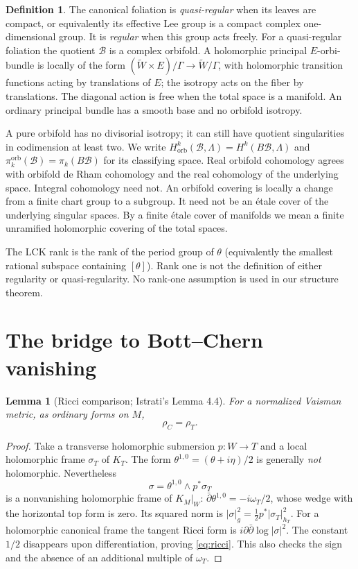 \documentclass[12pt]{amsart}
\newtheorem{lem}[thm]{Lemma}
\theoremstyle{definition}
\newtheorem{defn}[thm]{Definition}
\theoremstyle{remark}
\numberwithin{equation}{section}
\newcommand{\cB}{\mathcal{B}}
\newcommand{\orb}{\mathrm{orb}}
\newcommand{\wt}{\omega_{T}}
\newcommand{\rhoT}{\rho_{T}}
\newcommand{\rhoC}{\rho_{C}}
\begin{document}
\begin{defn}\label{def:orb}
The canonical foliation is \emph{quasi-regular} when its leaves are compact,
or equivalently its effective Lee group is a compact complex
one-dimensional group. It is \emph{regular} when this group acts freely.
For a quasi-regular foliation the quotient $\cB$ is a complex orbifold.
A holomorphic principal $E$-orbi-bundle is locally of the form
$(\widetilde W\times E)/\Gamma\to\widetilde W/\Gamma$, with holomorphic
transition functions acting by translations of $E$; the isotropy acts on
the fiber by translations. The diagonal action is free when the total
space is a manifold. An ordinary principal bundle has a smooth base and
no orbifold isotropy.

A pure orbifold has no divisorial isotropy; it can still have quotient
singularities in codimension at least two. We write
$H^k_{\orb}(\cB,\Lambda)=H^k(B\cB,\Lambda)$ and
$\pi_k^{\orb}(\cB)=\pi_k(B\cB)$ for its classifying space.
Real orbifold cohomology agrees with orbifold de Rham cohomology and the
real cohomology of the underlying space. Integral cohomology need not.
An orbifold covering is locally a change from a finite chart group to
a subgroup. It need not be an \'etale cover of the underlying singular
spaces. By a finite \'etale cover of manifolds we mean a finite unramified
holomorphic covering of the total spaces.
\end{defn}

The LCK rank is the rank of the period group of $\theta$ (equivalently
the smallest rational subspace containing $[\theta]$). Rank one is not
the definition of either regularity or quasi-regularity. No rank-one
assumption is used in our structure theorem.

\section{The bridge to Bott--Chern vanishing}\label{sec:bridge}
\begin{lem}[Ricci comparison; Istrati's Lemma 4.4]\label{lem:ricci}
For a normalized Vaisman metric, as ordinary forms on $M$,
\begin{equation}\label{eq:ricci}
\rhoC=\rhoT.
\end{equation}
\end{lem}
\begin{proof}
Take a transverse holomorphic submersion $p:W\to T$ and a local
holomorphic frame $\sigma_T$ of $K_T$. The form
$\theta^{1,0}=(\theta+i\eta)/2$ is generally \emph{not} holomorphic.
Nevertheless
\[
\sigma=\theta^{1,0}\wedge p^*\sigma_T
\]
is a nonvanishing holomorphic frame of $K_M|_W$:
$\bar\partial\theta^{1,0}=-i\wt/2$, whose wedge with the horizontal
top form is zero. Its squared norm is
$|\sigma|_g^2=\tfrac12p^*|\sigma_T|_{h_T}^2$.
For a holomorphic canonical frame the tangent Ricci form is
$i\partial\bar\partial\log|\sigma|^2$. The constant $1/2$ disappears
upon differentiation, proving \eqref{eq:ricci}. This also checks the sign
and the absence of an additional multiple of $\wt$.
\end{proof}
\end{document}
